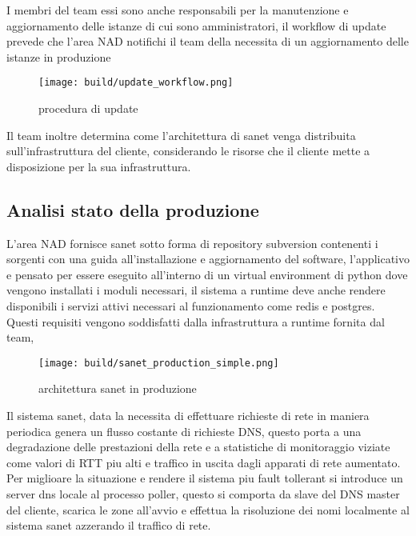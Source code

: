 \documentclass[12pt,a4paper,twoside,openright]{book}
\begin{document}
I membri del team essi sono anche responsabili per la manutenzione e aggiornamento delle istanze di cui sono amministratori, il workflow di update prevede che l'area NAD notifichi il team della necessita di un aggiornamento delle istanze in produzione


\begin{figure}[H]
    \centering
    \texttt{[image: build/update\_workflow.png]}
    \caption{procedura di update}
    \label{fig:enter-label}
\end{figure}

Il team inoltre determina come l'architettura di sanet venga distribuita sull'infrastruttura del cliente, considerando le risorse che il cliente mette a disposizione per la sua infrastruttura.

\subsection{Analisi stato della produzione}

L'area NAD fornisce sanet sotto forma di repository subversion contenenti i sorgenti con una guida all'installazione e aggiornamento del software, l'applicativo e pensato per essere eseguito all'interno di un virtual environment di python dove vengono installati i moduli necessari, il sistema a runtime deve anche rendere disponibili i servizi attivi necessari al funzionamento come redis e postgres. Questi requisiti vengono soddisfatti dalla infrastruttura a runtime fornita dal team,

\begin{figure}[H]
    \centering
    \texttt{[image: build/sanet\_production\_simple.png]}
    \caption{architettura sanet in produzione}
    \label{fig:enter-label}
\end{figure}

Il sistema sanet, data la necessita di effettuare richieste di rete in maniera periodica genera un flusso costante di richieste DNS, questo porta a una degradazione delle prestazioni della rete e a statistiche di monitoraggio viziate come valori di RTT piu alti e traffico in uscita dagli apparati di rete aumentato. Per miglioare la situazione e rendere il sistema piu fault tollerant si introduce un server dns locale al processo poller, questo si comporta da slave del DNS master del cliente, scarica le zone all'avvio e effettua la risoluzione dei nomi localmente al sistema sanet azzerando il traffico di rete.
\end{document}

